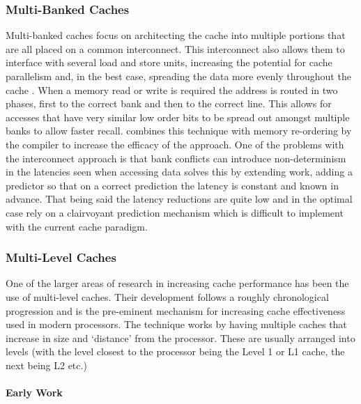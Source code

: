 \subsubsection{Multi-Banked Caches}

Multi-banked caches focus on architecting the cache into multiple portions that are all placed on a common interconnect. This interconnect also allows them to interface with several load and store units, increasing the potential for cache parallelism and, in the best case, spreading the data more evenly throughout the cache \cite{riversHighbandwidthDataCache1997}. When a memory read or write is required the address is routed in two phases, first to the correct bank and then to the correct line. This allows for accesses that have very similar low order bits to be spread out amongst multiple banks to allow faster recall. \citet{riversHighbandwidthDataCache1997} combines this technique with memory re-ordering by the compiler to increase the efficacy of the approach. One of the problems with the interconnect approach is that bank conflicts can introduce non-determinism in the latencies seen when accessing data \citet{neefsTechniqueHighBandwidth2000} solves this by extending \citeauthor{riversHighbandwidthDataCache1997} work, adding a predictor so that on a correct prediction the latency is constant and known in advance. That being said the latency reductions are quite low and in the optimal case rely on a clairvoyant prediction mechanism which is difficult to implement with the current cache paradigm.

\subsubsection{Multi-Level Caches}
\label{sec:multi-level}
One of the larger areas of research in increasing cache performance has been the use of multi-level caches. Their development follows a roughly chronological progression and is the pre-eminent mechanism for increasing cache effectiveness used in modern processors. The technique works by having multiple caches that increase in size and `distance' from the processor. These are usually arranged into levels (with the level closest to the processor being the Level 1 or L1 cache, the next being L2 etc.) 

\paragraph{Early Work}

